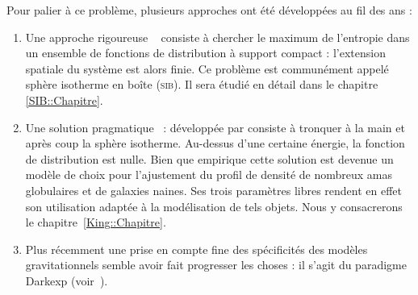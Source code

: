 	Pour palier à ce problème, plusieurs approches ont été développées au fil des ans :
	
	\begin{enumerate}
		\item Une approche \og rigoureuse \fg~ consiste à chercher le maximum de l'entropie dans un ensemble de fonctions de distribution à support compact :
			l'extension spatiale du système est alors finie. Ce problème est communément appelé sphère
			isotherme en boîte (\textsc{sib}). Il sera étudié en détail dans le chapitre \ref{SIB::Chapitre}.
			
		\item Une solution \og pragmatique \fg~: développée par \cite{King-1966AJ} consiste à tronquer à la main
			et après coup la sphère isotherme. Au-dessus d'une certaine énergie, la fonction de
			distribution est nulle. Bien que empirique cette solution est devenue un modèle de choix pour
			l'ajustement du profil de densité de nombreux amas globulaires et de galaxies naines. Ses trois
			paramètres libres rendent en effet son utilisation adaptée à la modélisation de tels objets.
			Nous y consacrerons le chapitre~\ref{King::Chapitre}.
		
		\item Plus récemment une prise en compte fine des spécificités des modèles gravitationnels semble avoir
			fait progresser les choses : il s'agit du paradigme Darkexp (voir~\citet{2010ApJ...722..851H}).
	
	\end{enumerate}
